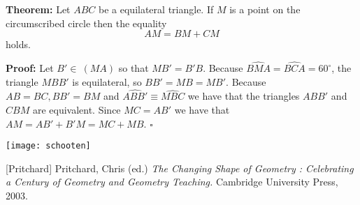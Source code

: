 \documentclass[12pt]{article}
\begin{document}
\textbf{Theorem:} Let $ABC$ be a equilateral triangle. If $M$ is a
point on the circumscribed circle then the equality $$AM=BM+CM$$
holds.

\textbf{Proof:} Let $B'\in\ (MA)$ so that $MB'=B'B$. Because
$\widehat{BMA}=\widehat{BCA}=60^\circ$, the triangle $MBB'$ is
equilateral, so $BB'=MB=MB'$. Because $AB=BC, BB'=BM$ and
$\widehat{ABB'}\equiv\widehat{MBC}$ we have that the triangles
$ABB'$ and $CBM$ are equivalent. Since $MC=AB'$ we have that
$AM=AB'+B'M=MC+MB$. $\square$

\begin{center}
\texttt{[image: schooten]}
\end{center}

\begin{thebibliography}{9}
[Pritchard] Pritchard, Chris (ed.) \emph{The Changing Shape of Geometry : Celebrating a Century of Geometry and Geometry Teaching.}  Cambridge University Press, 2003.
\end{thebibliography}
\end{document}
